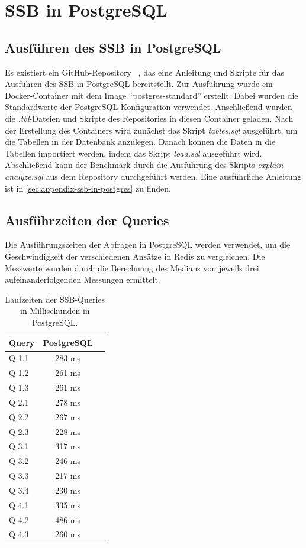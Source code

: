 \chapter{SSB in PostgreSQL}\label{sec:ssb-in-postgres}
\section{Ausführen des SSB in PostgreSQL}

Es existiert ein GitHub-Repository ~\cite{nukoyokohama_ssb-postgres_2023}, das eine Anleitung und Skripte für das Ausführen des \ac{SSB} in PostgreSQL bereitstellt.
Zur Ausführung wurde ein Docker-Container mit dem Image \enquote{postgres-standard} erstellt.
Dabei wurden die Standardwerte der PostgreSQL-Konfiguration verwendet.
Anschließend wurden die \emph{.tbl}-Dateien und Skripte des Repositories in diesen Container geladen. 
Nach der Erstellung des Containers wird zunächst das Skript \emph{tables.sql} ausgeführt, um die Tabellen in der Datenbank anzulegen.
Danach können die Daten in die Tabellen importiert werden, indem das Skript \emph{load.sql} ausgeführt wird.
Abschließend kann der Benchmark durch die Ausführung des Skripts \emph{explain-analyze.sql} aus dem Repository durchgeführt werden.
Eine ausführliche Anleitung ist in \cref{sec:appendix-ssb-in-postgres} zu finden.
\newpage
\section{Ausführzeiten der Queries} %
Die Ausführungszeiten der Abfragen in PostgreSQL werden verwendet, um die Geschwindigkeit der verschiedenen Ansätze in Redis zu vergleichen. Die Messwerte wurden durch die Berechnung des Medians von jeweils drei aufeinanderfolgenden Messungen ermittelt.
\begin{table}[h]
\centering
\begin{tabular}{lcc}
\hline
Query & PostgreSQL \\ \hline
Q 1.1 & 283 ms       \\
Q 1.2 & 261 ms       \\
Q 1.3 & 261 ms       \\
Q 2.1 & 278 ms       \\
Q 2.2 & 267 ms       \\
Q 2.3 & 228 ms       \\
Q 3.1 & 317 ms       \\
Q 3.2 & 246 ms       \\
Q 3.3 & 217 ms       \\
Q 3.4 & 230 ms       \\
Q 4.1 & 335 ms       \\
Q 4.2 & 486 ms       \\
Q 4.3 & 260 ms       \\ \hline
\end{tabular}
\caption{Laufzeiten der SSB-Queries in Millisekunden in PostgreSQL.}
\label{tab:results-postgres}
\end{table}

